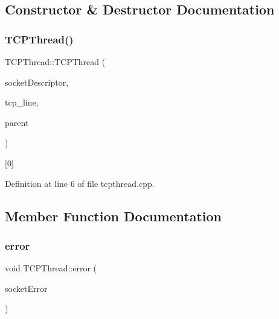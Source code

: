 \subsection{Constructor \& Destructor Documentation}
\mbox{\label{classTCPThread_a19f6df426c668c28309d294d8764a041}} 
\subsubsection{\texorpdfstring{T\+C\+P\+Thread()}{TCPThread()}}
{\footnotesize\ttfamily T\+C\+P\+Thread\+::\+T\+C\+P\+Thread (\begin{DoxyParamCaption}\item[{int}]{socket\+Descriptor,  }\item[{const Q\+String \&}]{tcp\+\_\+line,  }\item[{Q\+Object $\ast$}]{parent }\end{DoxyParamCaption})}



\mbox{[}0\mbox{]} 



Definition at line 6 of file tcpthread.\+cpp.



\subsection{Member Function Documentation}
\mbox{\label{classTCPThread_a582a30cfbf6105741b2638990271863f}} 
\subsubsection{\texorpdfstring{error}{error}}
{\footnotesize\ttfamily void T\+C\+P\+Thread\+::error (\begin{DoxyParamCaption}\item[{Q\+Tcp\+Socket\+::\+Socket\+Error}]{socket\+Error }\end{DoxyParamCaption})\hspace{0.3cm}{\ttfamily [signal]}}

\mbox{\label{classTCPThread_a3f78809c75e6355ec90e05c47fd2f6e6}} 
